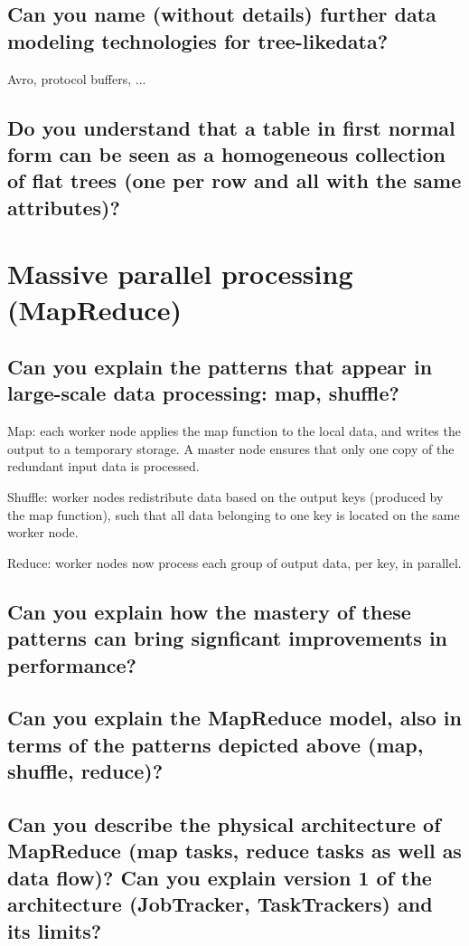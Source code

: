 \documentclass{article}
\begin{document}
\subsection{Can you name (without details) further data modeling technologies for tree-likedata?}

Avro, protocol buffers, ...

\subsection{Do you understand that a table in first normal form can be seen as a homogeneous collection of flat trees (one per row and all with the same attributes)?}



\pagebreak

\section{Massive parallel processing (MapReduce)}
\subsection{Can you explain the patterns that appear in large-scale data processing: map, shuffle?}

Map: each worker node applies the map function to the local data, and writes the output to a temporary storage. A master node ensures that only one copy of the redundant input data is processed.

Shuffle: worker nodes redistribute data based on the output keys (produced by the map function), such that all data belonging to one key is located on the same worker node.

Reduce: worker nodes now process each group of output data, per key, in parallel.

\subsection{Can you explain how the mastery of these patterns can bring signficant improvements in performance?}

\subsection{Can you explain the MapReduce model, also in terms of the patterns depicted above (map, shuffle, reduce)?}
\subsection{Can you describe the physical architecture of MapReduce (map tasks, reduce tasks as well as data flow)? Can you explain version 1 of the architecture (JobTracker, TaskTrackers) and its limits?}
\end{document}

